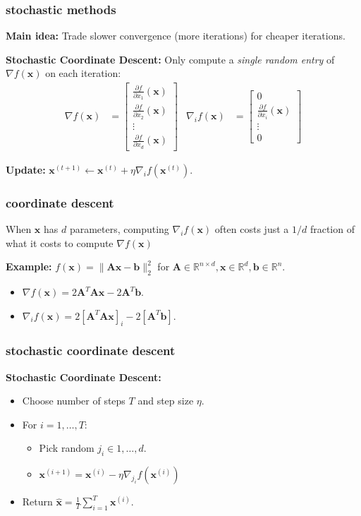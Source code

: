 \documentclass[compress]{beamer}
\newcommand{\bv}[1]{\mathbf{#1}}
\newcommand{\R}{\mathbb{R}}
\begin{document}
\begin{frame}
	\frametitle{stochastic methods}
	\textbf{Main idea:} Trade slower convergence (more iterations) for cheaper iterations. 
	\vspace{2em}
	
	\textbf{Stochastic \alert{Coordinate Descent}:}
	Only compute a \emph{single random entry} of $\nabla f(\bv{x})$ on each iteration:
	\begin{align*}
	\nabla f(\bv{x}) &= 
	\begin{bmatrix}
	\frac{\partial f}{\partial x_1}(\bv{x}) \\ \frac{\partial f}{\partial x_2}(\bv{x}) \\ \vdots \\ \frac{\partial f}{\partial x_d}(\bv{x})  
	\end{bmatrix} & 	\nabla_i f(\bv{x}) &= 
	\begin{bmatrix}
	0\\ \frac{\partial f}{\partial x_i}(\bv{x}) \\ \vdots \\ 0
	\end{bmatrix} 
	\end{align*}
	
\textbf{Update:} $\bv{x}^{(t+1)}\leftarrow \bv{x}^{(t)} + \eta \nabla_i f(\bv{x}^{(t)})$.
\end{frame}

\begin{frame}[t]
	\frametitle{coordinate descent}
	When $\bv{x}$ has $d$ parameters, computing $\nabla_i f(\bv{x})$ often costs just a $1/d$ fraction of what it costs to compute $\nabla f(\bv{x})$ 
	
	\vspace{1em}
	\textbf{Example:} $f(\bv{x}) = \|\bv{A}\bv{x} - \bv{b}\|_2^2$ for $\bv{A} \in \R^{n\times d}, \bv{x} \in \R^{d}, \bv{b} \in \R^n$. 
	\begin{itemize}
		\item $\nabla f(\bv{x}) = 2\bv{A}^T\bv{A}\bv{x} - 2\bv{A}^T\bv{b}$.
		\item $\nabla_i f(\bv{x}) = 2\left[\bv{A}^T\bv{A}\bv{x}\right]_i - 2\left[\bv{A}^T\bv{b}\right]$.
	\end{itemize}
\end{frame}

\begin{frame}[t]
	\frametitle{stochastic coordinate descent}	
	\textbf{Stochastic Coordinate Descent:}
	\begin{itemize}
		\item Choose number of steps $T$ and step size $\eta$.
		\item For $i = 1,\ldots, T$:
		\begin{itemize}
			\item Pick random $j_i \in 1, \ldots, d$.
			\item $\bv{x}^{(i+1)} = \bv{x}^{(i)} - \eta \nabla_{j_i} f(\bv{x}^{(i)})$
		\end{itemize}
		\item Return $\hat{\bv{x}} = \frac{1}{T}\sum_{i=1}^T \bv{x}^{(i)}$.
	\end{itemize}
\end{frame}
\end{document}
